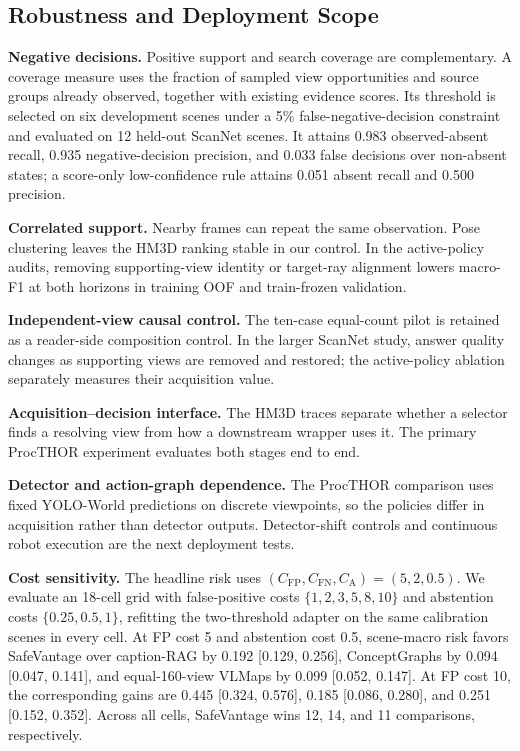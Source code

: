 \documentclass{article}
\newcommand{\method}{SafeVantage}
\begin{document}
\subsection{Robustness and Deployment Scope}
\label{app:robustness}
\textbf{Negative decisions.} Positive support and search coverage are complementary. A coverage measure uses the fraction of sampled view opportunities and source groups already observed, together with existing evidence scores. Its threshold is selected on six development scenes under a 5\% false-negative-decision constraint and evaluated on 12 held-out ScanNet scenes. It attains 0.983 observed-absent recall, 0.935 negative-decision precision, and 0.033 false decisions over non-absent states; a score-only low-confidence rule attains 0.051 absent recall and 0.500 precision.

\textbf{Correlated support.} Nearby frames can repeat the same observation. Pose clustering leaves the HM3D ranking stable in our control. In the active-policy audits, removing supporting-view identity or target-ray alignment lowers macro-F1 at both horizons in training OOF and train-frozen validation.

\textbf{Independent-view causal control.} The ten-case equal-count pilot is retained as a reader-side composition control. In the larger ScanNet study, answer quality changes as supporting views are removed and restored; the active-policy ablation separately measures their acquisition value.

\textbf{Acquisition--decision interface.} The HM3D traces separate whether a selector finds a resolving view from how a downstream wrapper uses it. The primary ProcTHOR experiment evaluates both stages end to end.

\textbf{Detector and action-graph dependence.} The ProcTHOR comparison uses fixed YOLO-World predictions on discrete viewpoints, so the policies differ in acquisition rather than detector outputs. Detector-shift controls and continuous robot execution are the next deployment tests.

\textbf{Cost sensitivity.} The headline risk uses $(C_{\mathrm{FP}},C_{\mathrm{FN}},C_{\mathrm{A}})=(5,2,0.5)$. We evaluate an 18-cell grid with false-positive costs $\{1,2,3,5,8,10\}$ and abstention costs $\{0.25,0.5,1\}$, refitting the two-threshold adapter on the same calibration scenes in every cell. At FP cost 5 and abstention cost 0.5, scene-macro risk favors \method{} over caption-RAG by 0.192 [0.129, 0.256], ConceptGraphs by 0.094 [0.047, 0.141], and equal-160-view VLMaps by 0.099 [0.052, 0.147]. At FP cost 10, the corresponding gains are 0.445 [0.324, 0.576], 0.185 [0.086, 0.280], and 0.251 [0.152, 0.352]. Across all cells, \method{} wins 12, 14, and 11 comparisons, respectively.

\clearpage

\end{document}
